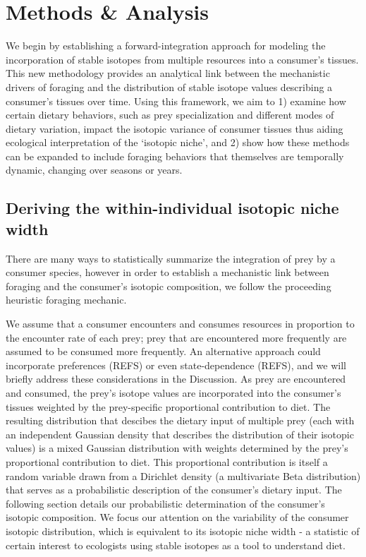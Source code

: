 \documentclass{frontiersSCNS}
\begin{document}
\section{Methods \& Analysis}
We begin by establishing a forward-integration approach for modeling the incorporation of stable isotopes from multiple resources into a consumer's tissues.
This new methodology provides an analytical link between the mechanistic drivers of foraging and the distribution of stable isotope values describing a consumer's tissues over time.
Using this framework, we aim to
1) examine how certain dietary behaviors, such as prey specialization and different modes of dietary variation, impact the isotopic variance of consumer tissues thus aiding ecological interpretation of the `isotopic niche', and
2) show how these methods can be expanded to include foraging behaviors that themselves are temporally dynamic, changing over seasons or years.

\subsection*{Deriving the within-individual isotopic niche width}
There are many ways to statistically summarize the integration of prey by a consumer species, however in order to establish a mechanistic link between foraging and the consumer's isotopic composition, we follow the proceeding heuristic foraging mechanic.

We assume that a consumer encounters and consumes resources in proportion to the encounter rate of each prey; prey that are encountered more frequently are assumed to be consumed more frequently.
An alternative approach could incorporate preferences (REFS) or even state-dependence (REFS), and we will briefly address these considerations in the Discussion.
As prey are encountered and consumed, the prey's isotope values are incorporated into the consumer's tissues weighted by the prey-specific proportional contribution to diet.
The resulting distribution that descibes the dietary input of multiple prey (each with an independent Gaussian density that describes the distribution of their isotopic values) is a mixed Gaussian distribution with weights determined by the prey's proportional contribution to diet.
This proportional contribution is itself a random variable drawn from a Dirichlet density (a multivariate Beta distribution) that serves as a probabilistic description of the consumer's dietary input.
The following section details our probabilistic determination of the consumer's isotopic composition.
We focus our attention on the variability of the consumer isotopic distribution, which is equivalent to its isotopic niche width - a statistic of certain interest to ecologists using stable isotopes as a tool to understand diet.
\end{document}
